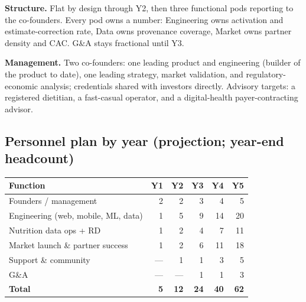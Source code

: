 \documentclass[10pt]{article}
\begin{document}
\textbf{Structure.} Flat by design through Y2, then three functional pods reporting to the co-founders. Every pod owns a number: Engineering owns activation and estimate-correction rate, Data owns provenance coverage, Market owns partner density and CAC. G\&A stays fractional until Y3.

\begin{center}
\end{center}

\textbf{Management.} Two co-founders: one leading product and engineering (builder of the product to date), one leading strategy, market validation, and regulatory-economic analysis; credentials shared with investors directly. Advisory targets: a registered dietitian, a fast-casual operator, and a digital-health payer-contracting advisor.

\subsection*{Personnel plan by year \normalfont\small\color{muted}(projection; year-end headcount)}

\begin{tabularx}{\textwidth}{@{}L r r r r r@{}}
\toprule
\textbf{Function} & \textbf{Y1} & \textbf{Y2} & \textbf{Y3} & \textbf{Y4} & \textbf{Y5}\\
\midrule
Founders / management & 2 & 2 & 3 & 4 & 5\\
Engineering (web, mobile, ML, data) & 1 & 5 & 9 & 14 & 20\\
Nutrition data ops + RD & 1 & 2 & 4 & 7 & 11\\
Market launch \& partner success & 1 & 2 & 6 & 11 & 18\\
Support \& community & --- & 1 & 1 & 3 & 5\\
G\&A & --- & --- & 1 & 1 & 3\\
\midrule
\textbf{Total} & \textbf{5} & \textbf{12} & \textbf{24} & \textbf{40} & \textbf{62}\\
\bottomrule
\end{tabularx}
\end{document}
